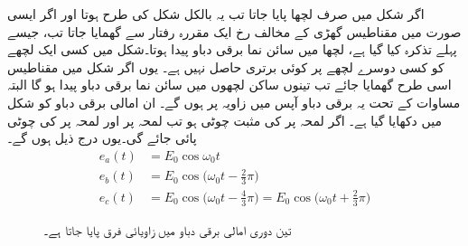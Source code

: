 اگر شکل  میں صرف لچھا  پایا جاتا تب یہ بالکل شکل    کی طرح ہوتا اور اگر ایسی صورت  میں مقناطیس  گھڑی کے مخالف رخ ایک مقررہ رفتار  سے گھمایا جاتا تب، جیسے پہلے تذکرہ کیا گیا ہے، لچھا  میں سائن نما برقی دباو پیدا ہوتا۔شکل   میں کسی ایک لچھے کو کسی دوسرے لچھے پر کوئی برتری حاصل نہیں ہے۔ یوں اگر شکل   میں  مقناطیس اسی طرح گھمایا جائے تب  تینوں ساکن لچھوں میں سائن نما برقی دباو پیدا ہو گا البتہ مساوات     کے تحت یہ برقی دباو آپس میں    زاویہ پر ہوں گے۔ ان امالی برقی دباو کو شکل  میں دکھایا گیا ہے۔ اگر لمحہ  پر    کی مثبت چوٹی ہو تب لمحہ  پر   اور لمحہ  پر  کی چوٹی پائی جائے گی۔یوں درج ذیل ہوں گے۔
\begin{align*}
e_a(t)&=E_0\cos \omega_0 t\\
e_b(t)&=E_0\cos\big(\omega_0 t-\frac{2}{3}\pi\big)\\
e_c(t)&=E_0\cos\big(\omega_0 t-\frac{4}{3}\pi\big)=E_0\cos\big(\omega_0 t+\frac{2}{3}\pi\big)
\end{align*}
%
\begin{figure}
\centering
{}
\caption{تین دوری امالی برقی دباو میں زاویائی فرق پایا جاتا ہے۔}
\label{شکل_گھومتے_مشین_اصول_تین_دوری_امالی_دباو}
\end{figure}


